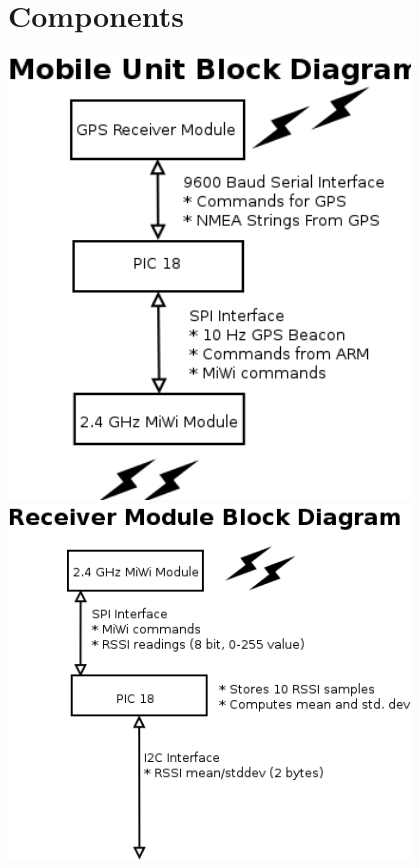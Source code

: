 \documentclass{article}
\begin{document}
\section*{Components}
\includegraphics[width=0.8\textwidth]{mobileUnit} \newline
\includegraphics[width=0.8\textwidth]{receiver}
\end{document}
